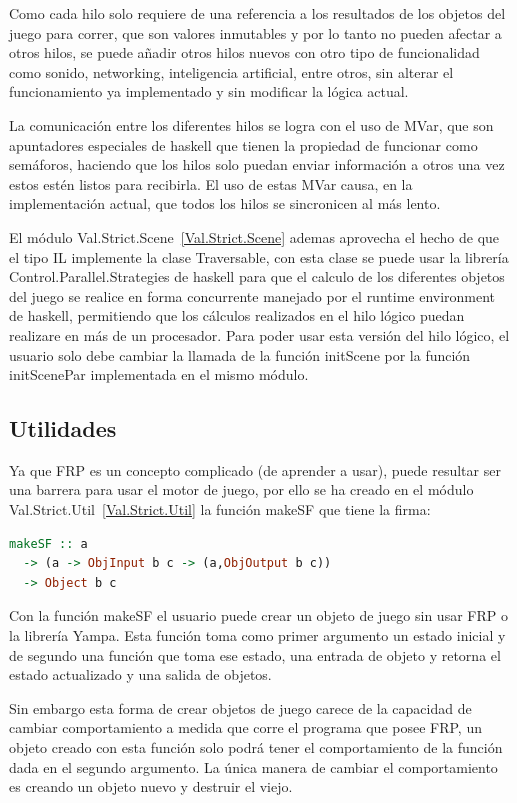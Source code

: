 Como cada hilo solo requiere de una referencia a los resultados de los objetos del juego para correr, que son valores inmutables y por lo tanto no pueden afectar a otros hilos, se puede añadir otros hilos nuevos con otro tipo de funcionalidad como sonido, networking, inteligencia artificial, entre otros, sin alterar el funcionamiento ya implementado y sin modificar la lógica actual.

La comunicación entre los diferentes hilos se logra con el uso de MVar, que son apuntadores especiales de haskell que tienen la propiedad de funcionar como semáforos, haciendo que los hilos solo puedan enviar información a otros una vez estos estén listos para recibirla. El uso de estas MVar causa, en la implementación actual, que todos los hilos se sincronicen al más lento.

El módulo Val.Strict.Scene~\ref{Val.Strict.Scene} ademas aprovecha el hecho de que el tipo IL implemente la clase Traversable, con esta clase se puede usar la librería Control.Parallel.Strategies de haskell para que el calculo de los diferentes objetos del juego se realice en forma concurrente manejado por el runtime environment de haskell, permitiendo que los cálculos realizados en el hilo lógico puedan realizare en más de un procesador. Para poder usar esta versión del hilo lógico, el usuario solo debe cambiar la llamada de la función initScene por la función initScenePar implementada en el mismo módulo.

\subsection{Utilidades}

Ya que FRP es un concepto complicado (de aprender a usar), puede resultar ser una barrera para usar el motor de juego, por ello se ha creado en el módulo Val.Strict.Util~\ref{Val.Strict.Util} la función makeSF que tiene la firma:

\begin{lstlisting}[frame=single,language=Haskell]
makeSF :: a
  -> (a -> ObjInput b c -> (a,ObjOutput b c))
  -> Object b c
\end{lstlisting}

Con la función makeSF el usuario puede crear un objeto de juego sin usar FRP o la librería Yampa. Esta función toma como primer argumento un estado inicial y de segundo una función que toma ese estado, una entrada de objeto y retorna el estado actualizado y una salida de objetos.

Sin embargo esta forma de crear objetos de juego carece de la capacidad de cambiar comportamiento a medida que corre el programa que posee FRP, un objeto creado con esta función solo podrá tener el comportamiento de la función dada en el segundo argumento. La única manera de cambiar el comportamiento es creando un objeto nuevo y destruir el viejo.
